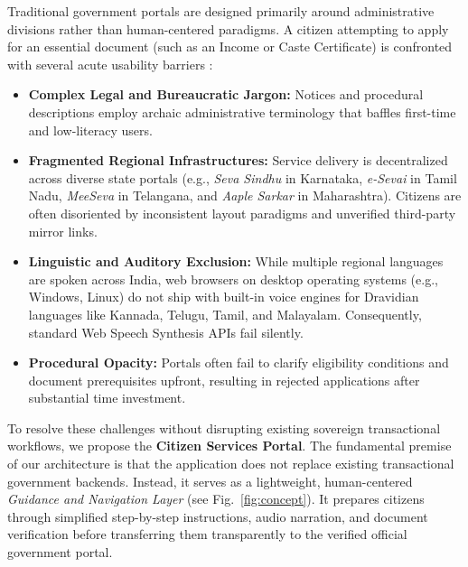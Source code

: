 \documentclass[conference]{IEEEtran}
\begin{document}
Traditional government portals are designed primarily around administrative divisions rather than human-centered paradigms. A citizen attempting to apply for an essential document (such as an Income or Caste Certificate) is confronted with several acute usability barriers \cite{joshi2011designing, medhi2007optimal}:
\begin{itemize}
    \item \textbf{Complex Legal and Bureaucratic Jargon:} Notices and procedural descriptions employ archaic administrative terminology that baffles first-time and low-literacy users.
    \item \textbf{Fragmented Regional Infrastructures:} Service delivery is decentralized across diverse state portals (e.g., \textit{Seva Sindhu} in Karnataka, \textit{e-Sevai} in Tamil Nadu, \textit{MeeSeva} in Telangana, and \textit{Aaple Sarkar} in Maharashtra). Citizens are often disoriented by inconsistent layout paradigms and unverified third-party mirror links.
    \item \textbf{Linguistic and Auditory Exclusion:} While multiple regional languages are spoken across India, web browsers on desktop operating systems (e.g., Windows, Linux) do not ship with built-in voice engines for Dravidian languages like Kannada, Telugu, Tamil, and Malayalam. Consequently, standard Web Speech Synthesis APIs fail silently.
    \item \textbf{Procedural Opacity:} Portals often fail to clarify eligibility conditions and document prerequisites upfront, resulting in rejected applications after substantial time investment.
\end{itemize}

To resolve these challenges without disrupting existing sovereign transactional workflows, we propose the \textbf{Citizen Services Portal}. The fundamental premise of our architecture is that the application does not replace existing transactional government backends. Instead, it serves as a lightweight, human-centered \textit{Guidance and Navigation Layer} (see Fig.~\ref{fig:concept}). It prepares citizens through simplified step-by-step instructions, audio narration, and document verification before transferring them transparently to the verified official government portal.
\end{document}

